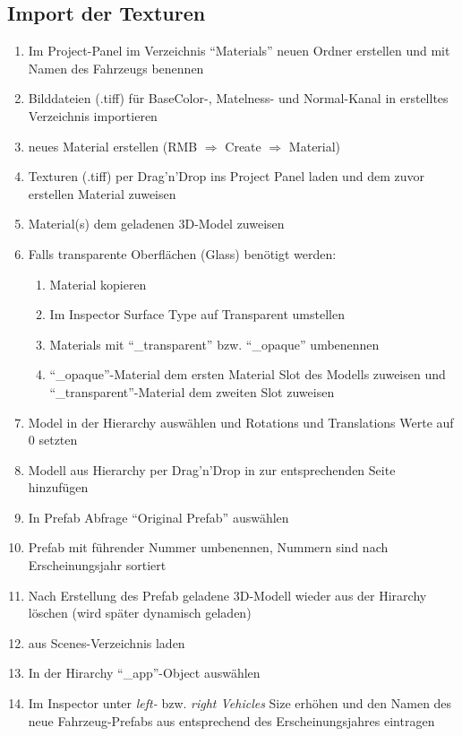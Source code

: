 \subsection{Import der Texturen}
%
\begin{enumerate}
	\item Im Project-Panel im Verzeichnis \enquote{Materials} neuen Ordner erstellen und mit Namen des Fahrzeugs benennen
	\item Bilddateien (.tiff) für BaseColor-, Matelness- und Normal-Kanal in erstelltes Verzeichnis importieren
	\item neues Material erstellen (RMB $\Rightarrow$ Create $\Rightarrow$ Material)
	\item Texturen (.tiff) per Drag'n'Drop ins Project Panel laden und dem zuvor erstellen Material zuweisen
	\item Material(s) dem geladenen 3D-Model zuweisen 
	\item Falls transparente Oberflächen (Glass) benötigt werden:
	\begin{enumerate}
		\item Material kopieren
		\item Im Inspector Surface Type auf Transparent umstellen
		\item Materials mit \enquote{\_transparent} bzw. \enquote{\_opaque} umbenennen
		\item \enquote{\_opaque}-Material dem ersten Material Slot des Modells zuweisen und \enquote{\_transparent}-Material dem zweiten Slot zuweisen
	\end{enumerate}
	\item Model in der Hierarchy auswählen und Rotations und Translations Werte auf 0 setzten
	\item Modell aus Hierarchy per Drag'n'Drop in  zur entsprechenden Seite hinzufügen
	\item In Prefab Abfrage \enquote{Original Prefab} auswählen
	\item Prefab mit führender Nummer umbenennen, Nummern sind nach Erscheinungsjahr sortiert
	\item Nach Erstellung des Prefab geladene 3D-Modell wieder aus der Hirarchy löschen (wird später dynamisch geladen)
	\item \pres aus Scenes-Verzeichnis laden
	\item In der Hirarchy \enquote{\_app}-Object auswählen
	\item Im Inspector unter \emph{left-} bzw. \emph{right Vehicles} Size erhöhen und den Namen des neue Fahrzeug-Prefabs aus  entsprechend des Erscheinungsjahres eintragen 
\end{enumerate}
%
\newpage
